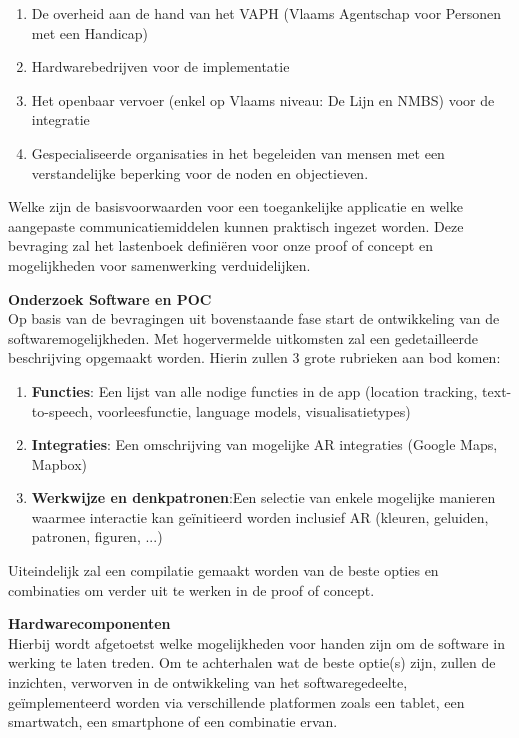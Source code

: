 \documentclass{hogent-article}
\begin{document}
    \begin{enumerate}
        \item De overheid aan de hand van het VAPH (Vlaams Agentschap voor Personen met een Handicap)
        \item Hardwarebedrijven voor de implementatie
        \item Het openbaar vervoer (enkel op Vlaams niveau: De Lijn en NMBS) voor de integratie
        \item Gespecialiseerde organisaties in het begeleiden van mensen met een verstandelijke beperking voor de noden en objectieven.
    \end{enumerate}

    Welke zijn de basisvoorwaarden voor een toegankelijke applicatie en welke aangepaste communicatiemiddelen kunnen praktisch ingezet worden. Deze bevraging zal het lastenboek definiëren voor onze proof of concept en mogelijkheden voor samenwerking verduidelijken. 
    
    \textbf{Onderzoek Software en POC} \\
    
    Op basis van de bevragingen uit bovenstaande fase start de ontwikkeling van de softwaremogelijkheden. Met hogervermelde uitkomsten zal een gedetailleerde beschrijving opgemaakt worden. Hierin zullen 3 grote rubrieken aan bod komen:
    
    \begin{enumerate}
        \item \textbf{Functies}: Een lijst van alle nodige functies in de app (location tracking, text-to-speech, voorleesfunctie, language models, visualisatietypes)
        \item \textbf{Integraties}: Een omschrijving van mogelijke AR integraties (Google Maps, Mapbox)
        \item \textbf{Werkwijze en denkpatronen}:Een selectie van enkele mogelijke manieren waarmee interactie kan geïnitieerd worden inclusief AR (kleuren, geluiden, patronen, figuren, ...)
    \end{enumerate}

    Uiteindelijk zal een compilatie gemaakt worden van de beste opties en combinaties om verder uit te werken in de proof of concept.
    
    \textbf{Hardwarecomponenten} \\
    
    Hierbij wordt afgetoetst welke mogelijkheden voor handen zijn om de software in werking te laten treden. Om te achterhalen wat de beste optie(s) zijn, zullen de inzichten, verworven in de ontwikkeling van het softwaregedeelte, geïmplementeerd worden via verschillende platformen zoals een tablet, een smartwatch, een smartphone of een combinatie ervan.
    
\end{document}
